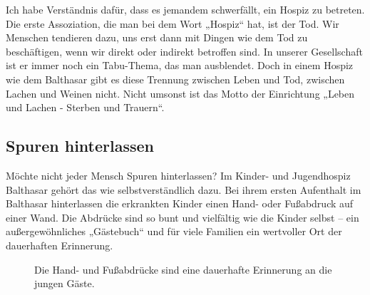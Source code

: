 \documentclass[fontsize=14pt,a4paper,headinclude,DIV=calc,automark]{scrbook}
\begin{document}
Ich habe Verständnis dafür, dass es jemandem schwerfällt, ein Hospiz zu betreten. Die erste Assoziation, die man bei dem Wort „Hospiz“ hat, ist der Tod. Wir Menschen tendieren dazu, uns erst dann mit Dingen wie dem Tod zu beschäftigen, wenn wir direkt oder indirekt betroffen sind. In unserer Gesellschaft ist er immer noch ein Tabu-Thema, das man ausblendet. Doch in einem Hospiz wie dem Balthasar gibt es diese Trennung zwischen Leben und Tod, zwischen Lachen und Weinen nicht. Nicht umsonst ist das Motto der Einrichtung „Leben und Lachen - Sterben und Trauern“.

\subsection{Spuren hinterlassen}

Möchte nicht jeder Mensch Spuren hinterlassen? Im Kinder- und Jugendhospiz Balthasar gehört das wie selbstverständlich dazu. Bei ihrem ersten Aufenthalt im Balthasar hinterlassen die erkrankten Kinder einen Hand- oder Fußabdruck auf einer Wand. Die Abdrücke sind so bunt und vielfältig wie die Kinder selbst – ein außergewöhnliches „Gästebuch“ und für viele Familien ein wertvoller Ort der dauerhaften Erinnerung.

\setlength{\fboxsep}{0pt}    %
\setlength{\fboxrule}{0.2pt} %
\begin{figure}[ht]
    \raggedright
    \caption{Die Hand- und Fußabdrücke sind eine dauerhafte Erinnerung an die jungen Gäste.}
    \label{fig:spuren_hinterlassen}
\end{figure}
\end{document}
